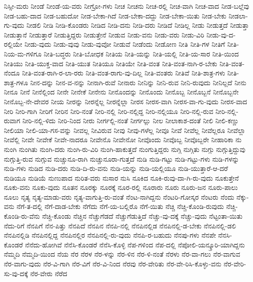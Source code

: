 {ನಿಸ್ಸೀ-ಮರು
ನೀಂಡೆ
ನೀಂಡೆ-ಯ-ವರು
ನೀಗ್ರೋ-ಗಳು
ನೀಚ
ನೀಚನು
ನೀಚ-ರಲ್ಲಿ
ನೀಚ-ವಾಗಿ
ನೀಚ-ವಾದ
ನೀಡ-ಬಲ್ಲೆವು
ನೀಡ-ಬಹು-ದಾದ
ನೀಡ-ಬಹುದೋ
ನೀಡ-ಬೇಕಾ-ಗಿದೆ
ನೀಡ-ಬೇಕಾ-ದದ್ದು
ನೀಡ-ಬೇಕಾ-ಯಿತು
ನೀಡ-ಬೇಕು
ನೀಡಲಾ-ಗು-ವುದು
ನೀಡಲಿ
ನೀಡಿ
ನೀಡಿ-ಕೊಂಡರು
ನೀಡಿದ
ನೀಡಿ-ದನು
ನೀಡಿ-ದರು
ನೀಡಿದೆ
ನೀಡಿಲ್ಲ
ನೀಡು
ನೀಡುತ್ತದೆ
ನೀಡುತ್ತಾ
ನೀಡುತ್ತಾನೆ
ನೀಡುತ್ತಾರೆ
ನೀಡುತ್ತಿದ್ದರು
ನೀಡುತ್ತೇನೆ
ನೀಡುವ
ನೀಡು-ವನು
ನೀಡು-ವರು
ನೀಡು-ವಿರಿ
ನೀಡು-ವು-ದ-ರಲ್ಲಿಯೇ
ನೀಡು-ವುದು
ನೀಡು-ವುವು
ನೀಡು-ವುವೋ
ನೀಡುವೆ
ನೀಡೆಂದು
ನೀಡೋಣ
ನೀತಿ
ನೀತಿ-ಗಳ
ನೀತಿಗೆ
ನೀತಿ-ನಿಯ-ಮ-ಗಳಿಗೂ
ನೀತಿ-ಬದ್ಧರು
ನೀತಿ-ಬೋಧಕ
ನೀತಿಯ
ನೀತಿ-ಯನ್ನು
ನೀತಿ-ಯಲ್ಲಿ
ನೀತಿ-ಯ-ಸಾರ
ನೀತಿ-ಯಿಂದ
ನೀತಿಯು
ನೀತಿ-ಯುಕ್ತ-ವಾದ
ನೀತಿ-ಯುತ
ನೀತಿಯೂ
ನೀತಿಯೇ
ನೀತಿ-ವಂತ
ನೀತಿ-ವಂತ-ನಾಗಿ-ರ-ಬೇಕು
ನೀತಿ-ವಂತ-ನೆಂದೂ
ನೀತಿ-ವಂತ-ರಾಗಿ-ರ-ಲಾ-ರರು
ನೀತಿ-ವಂತ-ರಾಗು-ವು-ದಿಲ್ಲ
ನೀತಿ-ವಂತರು
ನೀತಿವೆ
ನೀತಿ-ಶಾತ್ರ-ಗಳು
ನೀತಿ-ಶಾತ್ರ-ಗಳೂ
ನೀನ-ದನ್ನು
ನೀನ-ವ-ನನ್ನು
ನೀನಾಗಿ-ರುವೆ
ನೀನಾರು
ನೀನಿನ್ನು
ನೀನಿ-ರುವ
ನೀನಿ-ರುವುದು
ನೀನಿಲ್ಲದೆ
ನೀನು
ನೀನೂ
ನೀನೆ
ನೀನೆಲ್ಲಿಂದ
ನೀನೇ
ನೀನೇಕೆ
ನೀನೇನು
ನೀನೊಂದನ್ನು
ನೀನೊಂದು
ನೀನೊಬ್ಬ
ನೀನೊಬ್ಬನೆ
ನೀನೊಬ್ಬನೇ
ನೀನೊಬ್ಬ-ನೇ-ದೇವರ
ನೀಯ
ನೀರನ್ನು
ನೀರನ್ನೆಲ್ಲ
ನೀರನ್ನೆಲ್ಲಾ
ನೀರಸ
ನೀರಸ-ವಾಗಿ
ನೀರಸ-ವಾ-ಗು-ವುದು
ನೀರಸ-ವಾದ
ನೀರಿ
ನೀರಿ-ಗಾಗಿ
ನೀರಿಗೆ
ನೀರಿನ
ನೀರಿ-ನಂತೆ
ನೀರಿ-ನಲ್ಲಿ
ನೀರಿ-ನಲ್ಲಿದ್ದ
ನೀರಿ-ನಲ್ಲಿಯೂ
ನೀರಿ-ನಲ್ಲಿ-ರುವ
ನೀರಿ-ನಲ್ಲಿ-ರುವಾಗ
ನೀರಿ-ನಲ್ಲಿ-ಳಿದು
ನೀರಿ-ನಿಂದ
ನೀರು
ನೀರ್ಗಲ್ಲಿ-ನಂತೆ
ನೀರ್ಗಲ್ಲು
ನೀಲ
ನೀಲಾಕಾಶ-ದಂತೆ
ನೀಲಿ
ನೀಲಿ-ಕಣ್ಣು
ನೀಲಿಯಾ
ನೀಲಿ-ಯಾ-ಗಸ-ವನ್ನು
ನೀವಲ್ಲ
ನೀವಿರುವ
ನೀವು
ನೀವು-ಗಳೆಲ್ಲ
ನೀವೂ
ನೀವೆ
ನೀವೆಲ್ಲ
ನೀವೆಲ್ಲರೂ
ನೀವೆಲ್ಲಾ
ನೀವೆಲ್ಲಿ
ನೀವೇ
ನೀವೇಕೆ
ನೀವೇ-ನಾದರೂ
ನೀವೇನೊ
ನೀವೇನೋ
ನೀವೊಂದು
ನೀವೊಬ್ಬ
ನೀವೊಬ್ಬರೇ
ನೀಹಾರಿಕಾ
ನು
ನುಂಗಿ
ನುಂಗಿತು
ನುಂಗಿ-ದರು
ನುಂಗಿ-ರು-ವಿರಿ
ನುಂಗಿ-ಹಾಕುತ್ತದೆ
ನುಂಗುತ್ತಿದ್ದರು
ನುಗ್ಗಿ
ನುಗ್ಗಿತು
ನುಗ್ಗು
ನುಗ್ಗುತ್ತಿದ್ದುವು
ನುಗ್ಗುತ್ತಿ-ರುವ
ನುಗ್ಗುವ
ನುಚ್ಚುನೂ-ರಾಗಿ
ನುಚ್ಚುನೂರಾ-ಗುತ್ತದೆ
ನುಡಿ
ನುಡಿ-ಗಟ್ಟು
ನುಡಿ-ಗಟ್ಟು-ಗಳು
ನುಡಿ-ಗಳನ್ನು
ನುಡಿ-ಗಳು
ನುಡಿದ
ನುಡಿ-ದರು
ನುಡಿ-ದಿ-ರು-ವನು
ನುಡಿ-ಯನ್ನು
ನುಡಿ-ಯಲ್ಲಿಯೂ
ನುಡಿ-ಯುತ್ತಾರೆ-ಆ-ದರೆ
ನುಡಿಯೂ
ನುಡಿಯೆ
ನುಣುಪಾದ
ನುರಿತ-ವರು
ನುಸಾರ
ನುಸಿ
ನೂಕಿದ
ನೂಕಿ-ರುವು-ದಾ-ಗಿ-ರು-ವುದು
ನೂಕುತ್ತೇನೆ
ನೂಕು-ವನು
ನೂಕು-ವುದು
ನೂತನ
ನೂರಕ್ಕು
ನೂರಕ್ಕೆ
ನೂರ-ರಲ್ಲಿ
ನೂರಾರು
ನೂರು
ನೂರು-ಜನ
ನೂರು-ಪಾಲು
ನೂಲು
ನೃತ್ಯ
ನೃತ್ಯ-ಮಾಡು-ವರು
ನೃತ್ಯ-ವಾಗುತ್ತಿ-ರು-ವಂತೆ
ನೆಂಟ-ನಾಗಿದ್ದನು
ನೆಂಟರಿ-ಗೋಸ್ಕರ
ನೆಂಟರು
ನೆಂದು
ನೆಕ್ಕು-ವನು
ನೆಗೆ-ತ-ದಲ್ಲಿ
ನೆಗೆ-ದಾಡ-ಬೇಕು
ನೆಗೆದು
ನೆಗೆ-ಯ-ಬಲ್ಲಿರೊ
ನೆಗೆ-ಯಿತು
ನೆಚ್ಚಿ
ನೆಚ್ಚಿ-ಕೊಂಡಿ-ರುವುದು
ನೆಚ್ಚಿ-ಕೊಂಡಿ-ರು-ವೆನು
ನೆಚ್ಚಿ-ಕೊಂಡು
ನೆಚ್ಚಿನ
ನೆಚ್ಚುಗೆಡದೆ
ನೆಚ್ಚುಗೆಡುತ್ತಿದೆ
ನೆಚ್ಚು-ವು-ದಕ್ಕೆ
ನೆಚ್ಚು-ವುದು
ನೆಟ್ಟಂತಾ-ಯಿತು
ನೆದು-ರಿಗೆ
ನೆನಪಿಗೆ
ನೆನ-ಪಿತ್ತು
ನೆನಪಿದೆ
ನೆನಪಿನ
ನೆನಪಿ-ನಲ್ಲಿ
ನೆನಪಿನಲ್ಲಿಡ
ನೆನಪಿನಲ್ಲಿ-ಡ-ಬೇಕು
ನೆನಪಿನಲ್ಲಿ-ಡಲಿ
ನೆನಪಿನಲ್ಲಿಡಿ
ನೆನಪಿನಲ್ಲಿದ್ದ
ನೆನಪಿನಲ್ಲಿರ
ನೆನಪಿನಲ್ಲಿ-ರು-ವುದು
ನೆನಪಿ-ರ-ಬಹುದು
ನೆನಪು-ಗಳು
ನೆನಪೇ
ನೆನಸಿ-ಕೊಂಡರೆ
ನೆನೆದು-ಹೋಗಿವೆ
ನೆನೆಸಿ-ಕೊಂಡರೆ
ನೆನೆಸಿ-ಕೊಳ್ಳಿ
ನೆಪ-ಗಳಿಂದ
ನೆಪ-ದಲ್ಲಿ
ನೆಪೋಲಿ-ಯನ್ಕ್ರೂರಿ-ಯಾಗಿದ್ದನು
ನೆಮ್ಮದಿ
ನೆಮ್ಮದಿ-ಯಿಂದ
ನೆಯ
ನೆರ
ನೆರಳ
ನೆರ-ಳನ್ನು
ನೆರ-ಳಿನ
ನೆರ-ಳಿ-ನಂತೆ
ನೆರಳು
ನೆರ-ವಾ-ಗಲು
ನೆರ-ವಾಗುವ
ನೆರ-ವಾಗು-ವುದು
ನೆರ-ವಿ-ಗಾಗಿ
ನೆರ-ವಿಗೆ
ನೆರ-ವಿ-ನಿಂದ
ನೆರವು
ನೆರ-ವೇರಿತು
ನೆರ-ವೇ-ರಿಸಿ-ಕೊಳ್ಳು-ವನು
ನೆರ-ವೇರಿ-ಸು-ವು-ದಕ್ಕೆ
ನೆರ-ವೇರು
ನೆರೆದ
}
